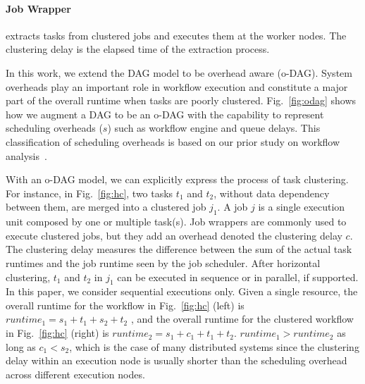 \documentclass[final]{IEEEtran}
\begin{document}
\paragraph{Job Wrapper} extracts tasks from clustered jobs and executes them at the worker nodes. The clustering delay is the  elapsed time of the extraction process.

In this work, we extend the DAG model to be overhead aware (o-DAG). System overheads play an important role in workflow execution and constitute a major part of the overall runtime when tasks are poorly clustered. Fig.~\ref{fig:odag} shows how we augment a DAG to be an o-DAG with the capability to represent scheduling overheads ($s$) such as workflow engine and queue delays. This classification of scheduling overheads is based on our prior study on workflow analysis~\cite{Chen}. 




With an o-DAG model, we can explicitly express the process of task clustering. For instance, in Fig.~\ref{fig:hc}, two tasks $t_1$ and $t_2$, without data dependency between them, are merged into a clustered job $j_1$. A job $j$ is a single execution unit composed by one or multiple task(s). Job wrappers are commonly used to execute clustered jobs, but they add an overhead denoted the clustering delay $c$. 
The clustering delay measures the difference between the sum of the actual task runtimes and the job runtime seen by the job scheduler. 
After horizontal clustering, $t_1$ and $t_2$ in $j_1$ can be executed in sequence or in parallel, if supported. In this paper, we consider sequential executions only. Given a single resource, the overall runtime for the workflow in Fig.~\ref{fig:hc} (left) is $runtime_1=s_1+t_1+s_2+t_2$ , and the overall runtime for the clustered workflow in Fig.~\ref{fig:hc} (right) is $runtime_2=s_1+c_1+t_1+t_2$.  $runtime_1 > runtime_2$ as long as $c_1 < s_2$, which is the case of many distributed systems since the clustering delay within an execution node is usually shorter than the scheduling overhead across different execution nodes.
\end{document}
